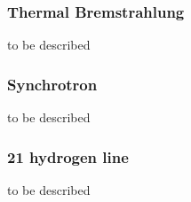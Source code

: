 \subsubsection{Thermal Bremstrahlung}
to be described
\subsubsection{Synchrotron}
to be described
\subsubsection{21 hydrogen line}
to be described

%
%
